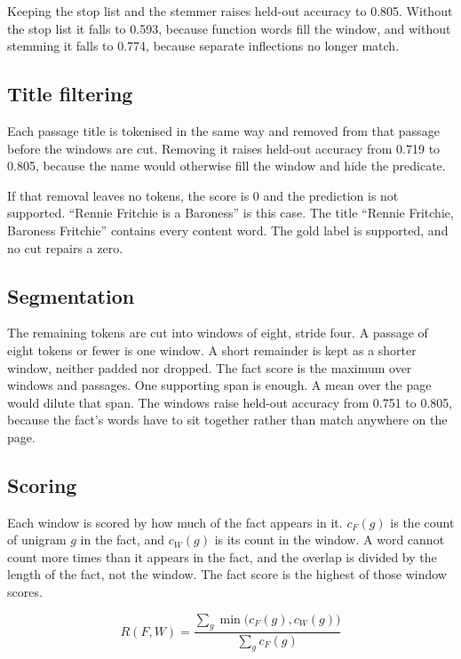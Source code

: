 Keeping the stop list and the stemmer raises held-out accuracy to 0.805. Without the stop list it falls to 0.593, because function words fill the window, and without stemming it falls to 0.774, because separate inflections no longer match.

\subsection{Title filtering}

Each passage title is tokenised in the same way and removed from that passage before the windows are cut. Removing it raises held-out accuracy from 0.719 to 0.805, because the name would otherwise fill the window and hide the predicate.

If that removal leaves no tokens, the score is 0 and the prediction is not supported. ``Rennie Fritchie is a Baroness'' is this case. The title ``Rennie Fritchie, Baroness Fritchie'' contains every content word. The gold label is supported, and no cut repairs a zero.

\subsection{Segmentation}

The remaining tokens are cut into windows of eight, stride four. A passage of eight tokens or fewer is one window. A short remainder is kept as a shorter window, neither padded nor dropped. The fact score is the maximum over windows and passages. One supporting span is enough. A mean over the page would dilute that span. The windows raise held-out accuracy from 0.751 to 0.805, because the fact's words have to sit together rather than match anywhere on the page.

\subsection{Scoring}

Each window is scored by how much of the fact appears in it. \(c_F(g)\) is the count of unigram \(g\) in the fact, and \(c_W(g)\) is its count in the window. A word cannot count more times than it appears in the fact, and the overlap is divided by the length of the fact, not the window. The fact score is the highest of those window scores.

\begin{equation}
R(F,W)=\frac{\sum_{g}\min\bigl(c_F(g),c_W(g)\bigr)}{\sum_{g}c_F(g)}
\end{equation}


